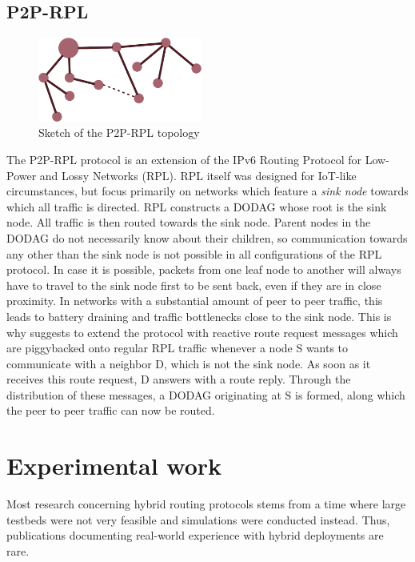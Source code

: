 \documentclass[a4paper,10pt]{scrartcl}
\begin{document}
\subsection{P2P-RPL}
\label{subsec:p2prpl}
\begin{figure}
  \begin{center}
    \includegraphics[width=0.48\textwidth]{../images/p2pRPL}
  \end{center}
  \label{fig:area_centered}
  \caption{Sketch of the P2P-RPL topology}
\end{figure}

The P2P-RPL protocol is an extension of the IPv6 Routing Protocol for Low-Power and Lossy Networks (RPL)\cite{RPL}. RPL itself was designed for IoT-like circumstances, but focus primarily on networks which feature a \emph{sink node} towards which all traffic is directed. RPL constructs a \gls{DODAG} whose root is the sink node. All traffic is then routed towards the sink node. Parent nodes in the DODAG do not necessarily know about their children, so communication towards any other than the sink node is not possible in all configurations of the RPL protocol. In case it is possible, packets from one leaf node to another will always have to travel to the sink node first to be sent back, even if they are in close proximity. In networks with a substantial amount of peer to peer traffic, this leads to battery draining and traffic bottlenecks close to the sink node. This is why \cite{baccelli_p2p_rpl} suggests to extend the protocol with reactive route request messages which are piggybacked onto regular RPL traffic whenever a node S wants to communicate with a neighbor D, which is not the sink node. As soon as it receives this route request, D answers with a route reply. Through the distribution of these messages, a DODAG originating at S is formed, along which the peer to peer traffic can now be routed.

\section{Experimental work}
\label{sec:experiments}
Most research concerning hybrid routing protocols stems from a time where large testbeds were not very feasible and simulations were conducted instead. %
Thus, publications documenting real-world experience with hybrid deployments are rare.\\
\end{document}
